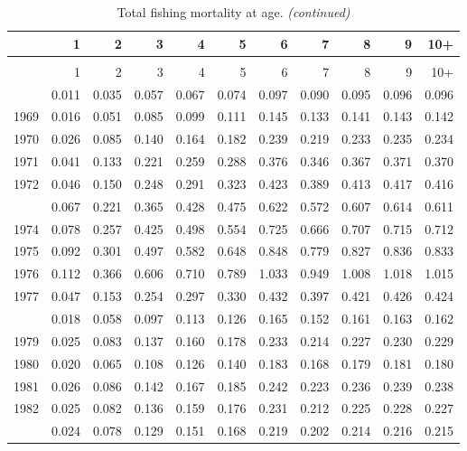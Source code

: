 \documentclass[
]{article}
\begin{document}
\begin{longtable}[t]{lrrrrrrrrrr}
\caption{\label{tab:FAA-tot-table}Total fishing mortality at age.}\\
\toprule
  & 1 & 2 & 3 & 4 & 5 & 6 & 7 & 8 & 9 & 10+\\
\midrule
\endfirsthead
\caption[]{Total fishing mortality at age. \textit{(continued)}}\\
\toprule
  & 1 & 2 & 3 & 4 & 5 & 6 & 7 & 8 & 9 & 10+\\
\midrule
\endhead

\endfoot
\bottomrule
\endlastfoot
1968 & 0.011 & 0.035 & 0.057 & 0.067 & 0.074 & 0.097 & 0.090 & 0.095 & 0.096 & 0.096\\
1969 & 0.016 & 0.051 & 0.085 & 0.099 & 0.111 & 0.145 & 0.133 & 0.141 & 0.143 & 0.142\\
1970 & 0.026 & 0.085 & 0.140 & 0.164 & 0.182 & 0.239 & 0.219 & 0.233 & 0.235 & 0.234\\
1971 & 0.041 & 0.133 & 0.221 & 0.259 & 0.288 & 0.376 & 0.346 & 0.367 & 0.371 & 0.370\\
1972 & 0.046 & 0.150 & 0.248 & 0.291 & 0.323 & 0.423 & 0.389 & 0.413 & 0.417 & 0.416\\
\addlinespace
1973 & 0.067 & 0.221 & 0.365 & 0.428 & 0.475 & 0.622 & 0.572 & 0.607 & 0.614 & 0.611\\
1974 & 0.078 & 0.257 & 0.425 & 0.498 & 0.554 & 0.725 & 0.666 & 0.707 & 0.715 & 0.712\\
1975 & 0.092 & 0.301 & 0.497 & 0.582 & 0.648 & 0.848 & 0.779 & 0.827 & 0.836 & 0.833\\
1976 & 0.112 & 0.366 & 0.606 & 0.710 & 0.789 & 1.033 & 0.949 & 1.008 & 1.018 & 1.015\\
1977 & 0.047 & 0.153 & 0.254 & 0.297 & 0.330 & 0.432 & 0.397 & 0.421 & 0.426 & 0.424\\
\addlinespace
1978 & 0.018 & 0.058 & 0.097 & 0.113 & 0.126 & 0.165 & 0.152 & 0.161 & 0.163 & 0.162\\
1979 & 0.025 & 0.083 & 0.137 & 0.160 & 0.178 & 0.233 & 0.214 & 0.227 & 0.230 & 0.229\\
1980 & 0.020 & 0.065 & 0.108 & 0.126 & 0.140 & 0.183 & 0.168 & 0.179 & 0.181 & 0.180\\
1981 & 0.026 & 0.086 & 0.142 & 0.167 & 0.185 & 0.242 & 0.223 & 0.236 & 0.239 & 0.238\\
1982 & 0.025 & 0.082 & 0.136 & 0.159 & 0.176 & 0.231 & 0.212 & 0.225 & 0.228 & 0.227\\
\addlinespace
1983 & 0.024 & 0.078 & 0.129 & 0.151 & 0.168 & 0.219 & 0.202 & 0.214 & 0.216 & 0.215\\

\end{longtable}
\end{document}
